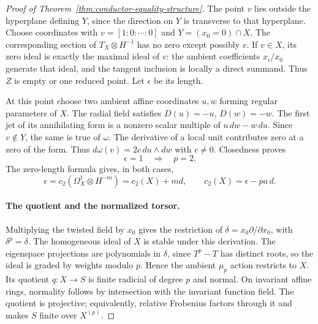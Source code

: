 \begin{proof}[Proof of Theorem~\ref{thm:conductor-equality-structure}]
The point $v$ lies outside the hyperplane defining $Y$, since the
direction on $Y$ is transverse to that hyperplane. Choose
coordinates with $v=[1:0:\cdots:0]$ and $Y=(x_0=0)\cap X$.
The corresponding section of $T_X\otimes H^{-1}$ has no zero
except possibly $v$. If $v\in X$, its zero ideal is exactly the
maximal ideal of $v$: the ambient coefficients $x_i/x_0$ generate
that ideal, and the tangent inclusion is locally a direct summand.
Thus $Z$ is empty or one reduced point. Let $\epsilon$ be its
length.

At this point choose two ambient affine coordinates $u,w$ forming
regular parameters of $X$. The radial field satisfies
$D(u)=-u$, $D(w)=-w$. The first jet of its annihilating form is
a nonzero scalar multiple of $u\,dw-w\,du$.
Since $v\notin Y$, the same is true of $\omega$.
The derivative of a local unit contributes zero at a zero of the
form. Thus $d\omega(v)=2c\,du\wedge dw$ with $c\ne0$.
Closedness proves
\begin{equation}\label{eq:conductor-epsilon-parity}
 \epsilon=1\quad\Longrightarrow\quad p=2.
\end{equation}
The zero-length formula gives, in both cases,
\begin{equation}\label{eq:conductor-c2X}
 \epsilon=c_2(\Omega_X^1\otimes H^{-m})=c_2(X)+md,
 \qquad c_2(X)=\epsilon-pa\,d.
\end{equation}

\paragraph{The quotient and the normalized torsor.}
Multiplying the twisted field by $x_0$ gives the restriction of
$\delta=x_0\partial/\partial x_0$, with $\delta^p=\delta$.
The homogeneous ideal of $X$ is stable under this derivation.
The eigenspace projections are polynomials in $\delta$, since
$T^p-T$ has distinct roots, so the ideal is graded by weights
modulo $p$. Hence the ambient $\mu_p$ action restricts to $X$.
Its quotient $q:X\to S$ is finite radicial of degree $p$ and
normal. On invariant affine rings, normality follows by
intersection with the invariant function field. The quotient is
projective; equivalently, relative Frobenius factors through it
and makes $S$ finite over $X^{(p)}$.


\end{proof}
